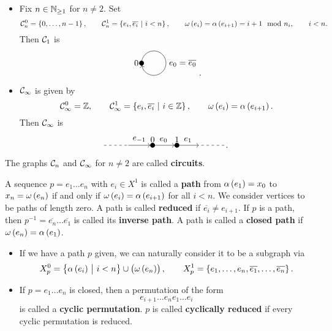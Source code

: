 \begin{example}
\hfill
\begin{itemize}
\item Fix $ n \in \mathbb{N}_{\ge 1} $ for $ n \ne 2 $. Set
$$ \CCC_n^0 = \cbr{0, \dots, n - 1}, \qquad \CCC_n^1 = \cbr{e_i, \overline{e_i} \st i < n}, \qquad \omega\br{e_i} = \alpha\br{e_{i + 1}} = i + 1 \mod n_i, \qquad i < n. $$
Then $ \mathcal{C}_1 $ is
$$
\begin{tikzpicture}
\fill (0, 0) circle (0.1) node[left]{$ 0 $};
\draw [->] (0, 0) arc (180:-170:0.5);
\draw (1, 0) node[right]{$ e_0 = \overline{e_0} $};
\end{tikzpicture}.
$$
\item $ \mathcal{C}_\infty $ is given by
$$ \CCC_\infty^0 = \ZZ, \qquad \CCC_\infty^1 = \cbr{e_i, \overline{e_i} \st i \in \ZZ}, \qquad \omega\br{e_i} = \alpha\br{e_{i + 1}}. $$
Then $ \mathcal{C}_\infty $ is
$$
\begin{tikzpicture}
\fill (0, 0) circle (0.1) node[above]{$ 0 $};
\fill (1, 0) circle (0.1) node[above]{$ 1 $};
\draw [dashed] (-2, 0) to (-1, 0);
\draw [->] (-1, 0) to node[above]{$ e_{-1} $} (-0.1, 0);
\draw [->] (0, 0) to node[above]{$ e_0 $} (0.9, 0);
\draw [->] (1, 0) to node[above]{$ e_1 $} (1.9, 0);
\draw [dashed] (2, 0) to (3, 0);
\end{tikzpicture}.
$$
\end{itemize}
The graphs $ \mathcal{C}_n $ and $ \mathcal{C}_\infty $ for $ n \ne 2 $ are called \textbf{circuits}.
\end{example}


A sequence $ p = e_1 \dots e_n $ with $ e_i \in X^1 $ is called a \textbf{path} from $ \alpha\br{e_1} = x_0 $ to $ x_n = \omega\br{e_n} $ if and only if $ \omega\br{e_i} = \alpha\br{e_{i + 1}} $ for all $ i < n $. We consider vertices to be paths of length zero. A path is called \textbf{reduced} if $ \overline{e_i} \ne e_{i + 1} $. If $ p $ is a path, then $ p^{-1} = \overline{e_n} \dots \overline{e_1} $ is called its \textbf{inverse path}. A path is called a \textbf{closed path} if $ \omega\br{e_n} = \alpha\br{e_1} $.

\begin{note*}
\hfill
\begin{itemize}
\item If we have a path $ p $ given, we can naturally consider it to be a subgraph via
$$ X_p^0 = \cbr{\alpha\br{e_i} \st i < n} \cup \br{\omega\br{e_n}}, \qquad X_p^1 = \cbr{e_1, \dots, e_n, \overline{e_1}, \dots, \overline{e_n}}. $$
\item If $ p = e_1 \dots e_n $ is closed, then a permutation of the form
$$ e_{i + 1} \dots e_ne_1 \dots e_i $$
is called a \textbf{cyclic permutation}. $ p $ is called \textbf{cyclically reduced} if every cyclic permutation is reduced.
\end{itemize}
\end{note*}

